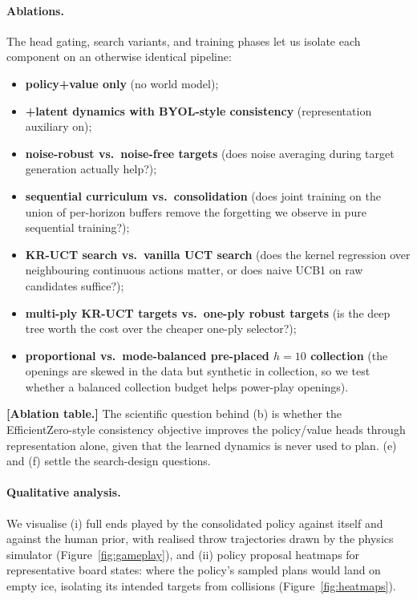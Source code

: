 \documentclass[11pt]{article}
\newcommand{\res}[1]{{\color{blue}\textbf{[#1]}}}
\begin{document}
\paragraph{Ablations.}
The head gating, search variants, and training phases let us isolate each
component on an otherwise identical pipeline:
\begin{itemize}
\item[(a)] \textbf{policy+value only} (no world model);
\item[(b)] \textbf{+latent dynamics with BYOL-style consistency}
(representation auxiliary on);
\item[(c)] \textbf{noise-robust vs.\ noise-free targets} (does noise
averaging during target generation actually help?);
\item[(d)] \textbf{sequential curriculum vs.\ consolidation} (does joint
training on the union of per-horizon buffers remove the forgetting we
observe in pure sequential training?);
\item[(e)] \textbf{KR-UCT search vs.\ vanilla UCT search} (does the kernel
regression over neighbouring continuous actions matter, or does naive UCB1
on raw candidates suffice?);
\item[(f)] \textbf{multi-ply KR-UCT targets vs.\ one-ply robust targets}
(is the deep tree worth the cost over the cheaper one-ply selector?);
\item[(g)] \textbf{proportional vs.\ mode-balanced pre-placed $h{=}10$
collection} (the openings are skewed in the data but synthetic in
collection, so we test whether a balanced collection budget helps
power-play openings).
\end{itemize}
\res{Ablation table.} The scientific question behind (b) is whether the
EfficientZero-style consistency objective improves the policy/value heads
through representation alone, given that the learned dynamics is never used
to plan. (e) and (f) settle the search-design questions.

\paragraph{Qualitative analysis.}
We visualise (i) full ends played by the consolidated policy against itself
and against the human prior, with realised throw trajectories drawn by the
physics simulator (Figure~\ref{fig:gameplay}), and (ii) policy proposal
heatmaps for representative board states: where the policy's sampled plans
would land on empty ice, isolating its intended targets from collisions
(Figure~\ref{fig:heatmaps}).
\end{document}
